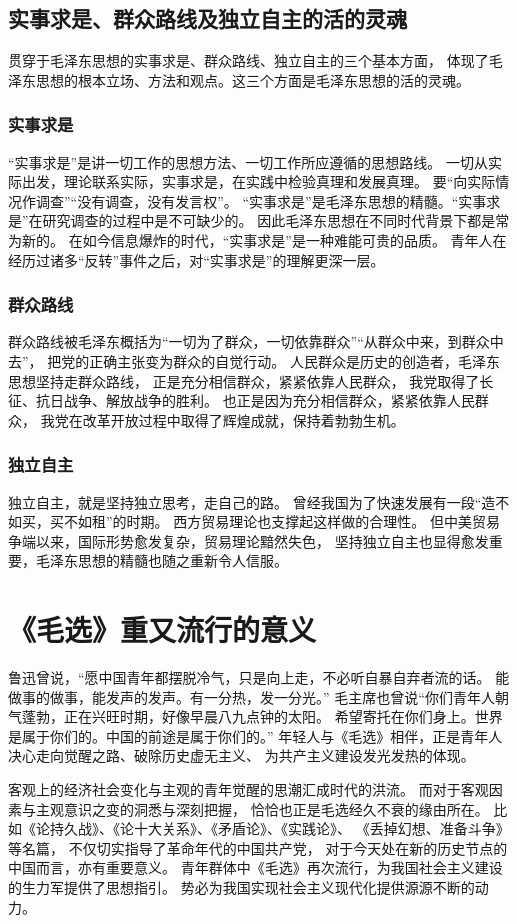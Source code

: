 \documentclass{ctexart}
\begin{document}
\subsection{实事求是、群众路线及独立自主的活的灵魂}

贯穿于毛泽东思想的实事求是、群众路线、独立自主的三个基本方面，
体现了毛泽东思想的根本立场、方法和观点。这三个方面是毛泽东思想的活的灵魂。

\subsubsection{实事求是}

“实事求是”是讲一切工作的思想方法、一切工作所应遵循的思想路线。
一切从实际出发，理论联系实际，实事求是，在实践中检验真理和发展真理。
要“向实际情况作调查”“没有调查，没有发言权”。
“实事求是”是毛泽东思想的精髓。“实事求是”在研究调查的过程中是不可缺少的。
因此毛泽东思想在不同时代背景下都是常为新的。
在如今信息爆炸的时代，“实事求是”是一种难能可贵的品质。
青年人在经历过诸多“反转”事件之后，对“实事求是”的理解更深一层。

\subsubsection{群众路线}

群众路线被毛泽东概括为“一切为了群众，一切依靠群众”“从群众中来，到群众中去”，
把党的正确主张变为群众的自觉行动。
人民群众是历史的创造者，毛泽东思想坚持走群众路线，
正是充分相信群众，紧紧依靠人民群众，
我党取得了长征、抗日战争、解放战争的胜利。
也正是因为充分相信群众，紧紧依靠人民群众，
我党在改革开放过程中取得了辉煌成就，保持着勃勃生机。

\subsubsection{独立自主}

独立自主，就是坚持独立思考，走自己的路。
曾经我国为了快速发展有一段“造不如买，买不如租”的时期。
西方贸易理论也支撑起这样做的合理性。
但中美贸易争端以来，国际形势愈发复杂，贸易理论黯然失色，
坚持独立自主也显得愈发重要，毛泽东思想的精髓也随之重新令人信服。

\section{《毛选》重又流行的意义}

鲁迅曾说，“愿中国青年都摆脱冷气，只是向上走，不必听自暴自弃者流的话。
能做事的做事，能发声的发声。有一分热，发一分光。”
毛主席也曾说“你们青年人朝气蓬勃，正在兴旺时期，好像早晨八九点钟的太阳。
希望寄托在你们身上。世界是属于你们的。中国的前途是属于你们的。”
年轻人与《毛选》相伴，正是青年人决心走向觉醒之路、破除历史虚无主义、
为共产主义建设发光发热的体现。

客观上的经济社会变化与主观的青年觉醒的思潮汇成时代的洪流。
而对于客观因素与主观意识之变的洞悉与深刻把握，
恰恰也正是毛选经久不衰的缘由所在。
比如《论持久战》、《论十大关系》、《矛盾论》、《实践论》、
《丢掉幻想、准备斗争》等名篇，
不仅切实指导了革命年代的中国共产党，
对于今天处在新的历史节点的中国而言，亦有重要意义。
青年群体中《毛选》再次流行，为我国社会主义建设的生力军提供了思想指引。
势必为我国实现社会主义现代化提供源源不断的动力。
\nocite{*}
\printbibliography[heading=bibliography,title=参考文献]
\end{document}
